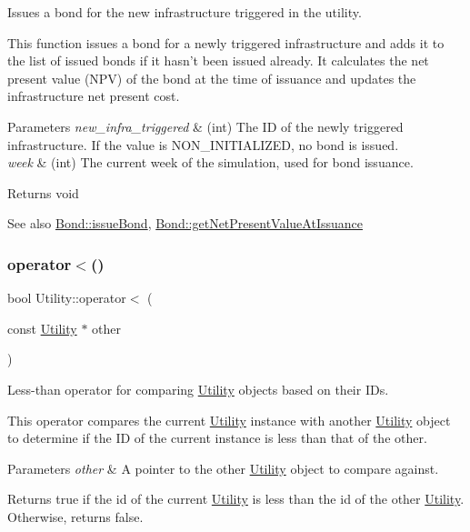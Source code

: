 Issues a bond for the new infrastructure triggered in the utility. 

This function issues a bond for a newly triggered infrastructure and adds it to the list of issued bonds if it hasn’t been issued already. It calculates the net present value (N\+PV) of the bond at the time of issuance and updates the infrastructure net present cost.


\begin{DoxyParams}{Parameters}
{\em new\+\_\+infra\+\_\+triggered} & (int) The ID of the newly triggered infrastructure. If the value is N\+O\+N\+\_\+\+I\+N\+I\+T\+I\+A\+L\+I\+Z\+ED, no bond is issued. \\
\hline
{\em week} & (int) The current week of the simulation, used for bond issuance.\\
\hline
\end{DoxyParams}
\begin{DoxyReturn}{Returns}
void 
\end{DoxyReturn}
\begin{DoxySeeAlso}{See also}
\mbox{\hyperlink{classBond_a726edbe3ea7047ebc7246585943763e3}{Bond\+::issue\+Bond}}, \mbox{\hyperlink{classBond_a5997278813deb16aa5d01bbca8ecc7b2}{Bond\+::get\+Net\+Present\+Value\+At\+Issuance}} 
\end{DoxySeeAlso}
\mbox{\label{classUtility_ae2dad8029e34c5bb073a5ddf4381d278}} 
\subsubsection{\texorpdfstring{operator$<$()}{operator<()}}
{\footnotesize\ttfamily bool Utility\+::operator$<$ (\begin{DoxyParamCaption}\item[{const \mbox{\hyperlink{classUtility}{Utility}} $\ast$}]{other }\end{DoxyParamCaption})}



Less-\/than operator for comparing \mbox{\hyperlink{classUtility}{Utility}} objects based on their I\+Ds. 

This operator compares the current \mbox{\hyperlink{classUtility}{Utility}} instance with another \mbox{\hyperlink{classUtility}{Utility}} object to determine if the ID of the current instance is less than that of the other.


\begin{DoxyParams}{Parameters}
{\em other} & A pointer to the other \mbox{\hyperlink{classUtility}{Utility}} object to compare against.\\
\hline
\end{DoxyParams}
\begin{DoxyReturn}{Returns}
true if the id of the current \mbox{\hyperlink{classUtility}{Utility}} is less than the id of the other \mbox{\hyperlink{classUtility}{Utility}}. Otherwise, returns false. 
\end{DoxyReturn}
\mbox{\label{classUtility_a9a362d68a5aa3ec934c286f3a7e9b721}} 
